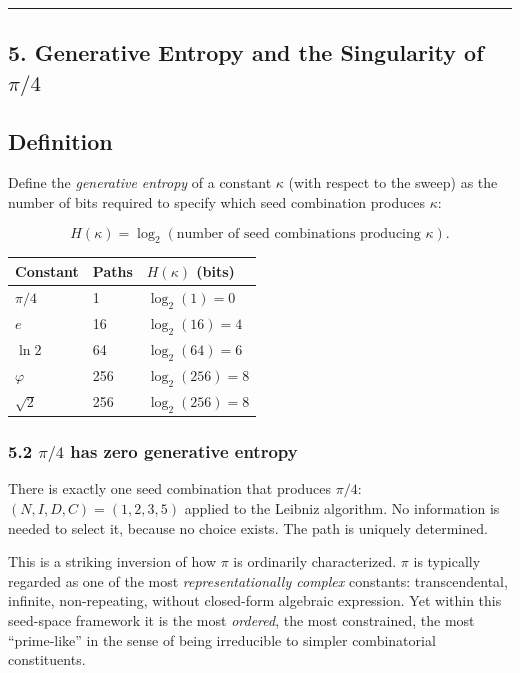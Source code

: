 \documentclass[12pt]{article}
\begin{document}
\begin{center}\rule{0.5\linewidth}{0.5pt}\end{center}

\subsection{\texorpdfstring{5. Generative Entropy and the Singularity of
\(\pi/4\)}{5. Generative Entropy and the Singularity of \textbackslash pi/4}}\label{generative-entropy-and-the-singularity-of-pi4}

\subsection{Definition}\label{definition}

Define the \emph{generative entropy} of a constant \(\kappa\) (with
respect to the sweep) as the number of bits required to specify which
seed combination produces \(\kappa\):

\[H(\kappa) = \log_2(\text{number of seed combinations producing } \kappa).
\]

\begin{longtable}[]{@{}lll@{}}
\toprule\noalign{}
Constant & Paths & \(H(\kappa)\) (bits) \\
\midrule\noalign{}
\endhead
\bottomrule\noalign{}
\endlastfoot
\(\pi/4\) & 1 & \(\log_2(1) = 0\) \\
\(e\) & 16 & \(\log_2(16) = 4\) \\
\(\ln 2\) & 64 & \(\log_2(64) = 6\) \\
\(\varphi\) & 256 & \(\log_2(256) = 8\) \\
\(\sqrt{2}\) & 256 & \(\log_2(256) = 8\) \\
\end{longtable}

\subsubsection{\texorpdfstring{5.2 \(\pi/4\) has zero generative
entropy}{5.2 \textbackslash pi/4 has zero generative entropy}}\label{pi4-has-zero-generative-entropy}

There is exactly one seed combination that produces \(\pi/4\):
\((N, I, D, C) = (1, 2, 3, 5)\) applied to the Leibniz algorithm. No
information is needed to select it, because no choice exists. The path
is uniquely determined.

This is a striking inversion of how \(\pi\) is ordinarily characterized.
\(\pi\) is typically regarded as one of the most
\emph{representationally complex} constants: transcendental, infinite,
non-repeating, without closed-form algebraic expression. Yet within this
seed-space framework it is the most \emph{ordered}, the most
constrained, the most ``prime-like'' in the sense of being irreducible
to simpler combinatorial constituents.
\end{document}
